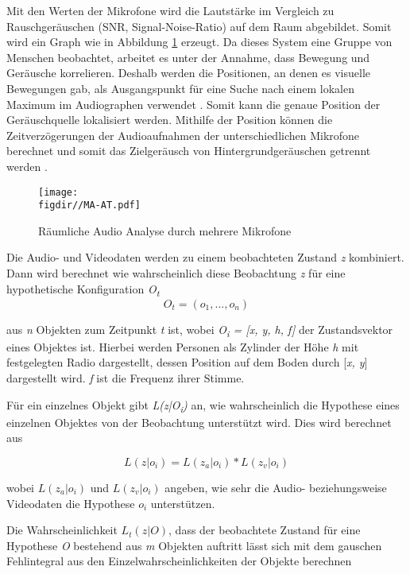 Mit den Werten der Mikrofone wird die Lautstärke im Vergleich zu Rauschgeräuschen (SNR, Signal-Noise-Ratio) auf dem Raum abgebildet. Somit wird ein Graph wie in Abbildung \ref{FIG:Array:Audio} erzeugt. Da dieses System eine Gruppe von Menschen beobachtet, arbeitet es unter der Annahme, dass Bewegung und Geräusche korrelieren. Deshalb werden die Positionen, an denen es visuelle Bewegungen gab, als Ausgangspunkt für eine Suche nach einem lokalen Maximum im Audiographen verwendet \cite{Che02:Audio}. Somit kann die genaue Position der Geräuschquelle lokalisiert werden. Mithilfe der Position können die Zeitverzögerungen der Audioaufnahmen der unterschiedlichen Mikrofone berechnet und somit das Zielgeräusch von Hintergrundgeräuschen getrennt werden \cite{Array:Audio}.    

\begin{figure}
\centering
\texttt{[image: \\figdir//MA-AT.pdf]}
\caption{Räumliche Audio Analyse durch mehrere Mikrofone}
\label{FIG:Array:Audio}
\end{figure}

\bigskip

Die Audio- und Videodaten werden zu einem beobachteten Zustand \textit{z} kombiniert. Dann wird berechnet wie wahrscheinlich diese Beobachtung \textit{z} für eine hypothetische Konfiguration \textit{O\textsubscript{t}}
\begin{equation}
O_t = (o_1, ..., o_n)
\end{equation}

aus \textit{n} Objekten zum Zeitpunkt \textit{t} ist, wobei \textit{O\textsubscript{i} = [x, y, h, f]} der Zustandsvektor eines Objektes ist. Hierbei werden Personen als Zylinder der Höhe \textit{h} mit festgelegten Radio dargestellt, dessen Position auf dem Boden durch [\textit{x, y}] dargestellt wird. \textit{f} ist die Frequenz ihrer Stimme.

Für ein einzelnes Objekt gibt \textit{L(z|O\textsubscript{i})} an, wie wahrscheinlich die Hypothese eines einzelnen Objektes von der Beobachtung unterstützt wird. Dies wird berechnet aus

\begin{equation}
L(z|o_i) = L(z_a|o_i) * L(z_v|o_i)
\end{equation}

wobei $L(z_a|o_i)$ und $L(z_v|o_i)$ angeben, wie sehr die Audio- beziehungsweise Videodaten die Hypothese $o_i$ unterstützen.

Die Wahrscheinlichkeit $L_t(z|O)$, dass der beobachtete Zustand für eine Hypothese \textit{O} bestehend aus \textit{m} Objekten auftritt lässt sich mit dem gauschen Fehlintegral aus den Einzelwahrscheinlichkeiten der Objekte berechnen

